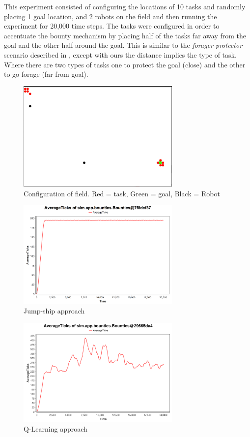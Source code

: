\documentclass[twocolumn]{article}
\begin{document}
This experiment consisted of configuring the locations of 10 tasks and randomly placing 1 goal location, and 2 robots on the field and then running the experiment for 20,000 time steps.  The tasks were configured in order to accentuate the bounty mechanism by placing half of the tasks far away from the goal and the other half around the goal.  This is similar to the \textit{forager-protector} scenario described in \cite{Campbell2010}, except with ours the distance implies the type of task.  Where there are two types of tasks one to protect the goal (close) and the other to go forage (far from goal).
\begin{figure}[H]
\includegraphics[width=8cm]{specialConfig}
\caption{Configuration of field.  Red = task, Green = goal, Black = Robot}
\end{figure}
\begin{figure}[H]
\includegraphics[width=8cm]{specialgreedy2and10}
\caption{Jump-ship approach}
\end{figure}
\begin{figure}[H]
\includegraphics[width=8cm]{specialqlearning2and10}
\caption{Q-Learning approach}
\end{figure}
\end{document}
